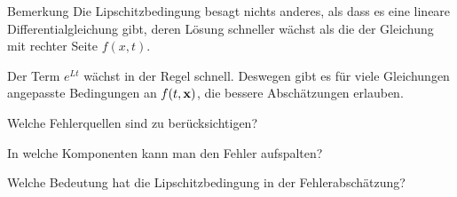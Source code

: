 
  

\begin{frame}
  \begin{block}{Bemerkung}
    Die Lipschitzbedingung besagt nichts anderes, als dass es eine
    lineare Differentialgleichung gibt, deren Lösung schneller wächst
    als die der Gleichung mit rechter Seite $f(x,t)$.
  \end{block}

  \pause

  Der Term $e^{Lt}$ wächst in der Regel schnell. Deswegen gibt es für
  viele Gleichungen angepasste Bedingungen an $f(t,\mathbf{x})$, die bessere
  Abschätzungen erlauben.
\end{frame}

\begin{Abschluss}
\item Welche Fehlerquellen sind zu berücksichtigen?
\item In welche Komponenten kann man den Fehler aufspalten?
\item Welche Bedeutung hat die Lipschitzbedingung in der Fehlerabschätzung?
\end{Abschluss}
